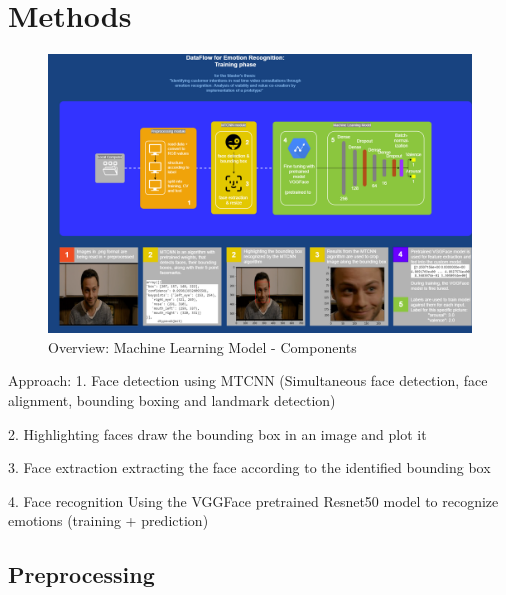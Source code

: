     
    


\section{Methods}	
\begin{figure}[H]
  \begin{center}
  \includegraphics[angle=90, width=1.0\textwidth]{Figures/DataFlow_Diagram.png}
  \caption{Overview: Machine Learning Model - Components}
  \label{fig:MachineLearningModelComponents}
  \end{center}
\end{figure}

Approach:
1. Face detection
using MTCNN (Simultaneous face detection, face alignment, bounding boxing and landmark detection)\cite{Brownlee:2019:VggFace2HowToFaceRec}

2. Highlighting faces
draw the bounding box in an image and plot it\cite{Brownlee:2019:VggFace2HowToFaceRec}

3. Face extraction
extracting the face according to the identified bounding box
\cite{Brownlee:2019:VggFace2HowToFaceRec}

4. Face recognition
Using the VGGFace pretrained Resnet50 model to recognize emotions (training + prediction)
\cite{Sharma:2018:RealTimeFacialExpression}


\subsection{Preprocessing}
